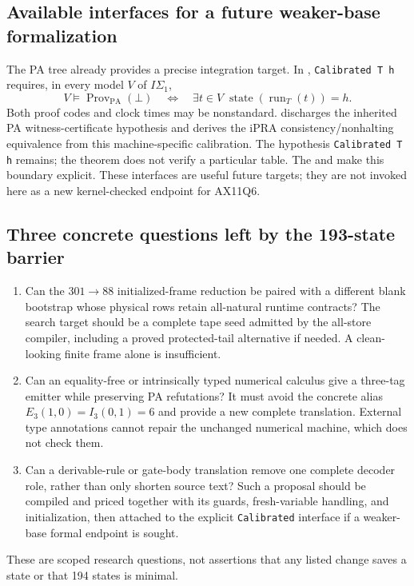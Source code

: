 \subsection{Available interfaces for a future weaker-base formalization}

The PA tree already provides a precise integration target.  In
,
\texttt{Calibrated T h} requires, in every model $V$ of $I\Sigma_1$,
\[
 V\models\operatorname{Prov}_{\mathrm{PA}}(\bot)
 \quad\Longleftrightarrow\quad
 \exists t\in V\; \operatorname{state}(\operatorname{run}_T(t))=h.
\]
Both proof codes and clock times may be nonstandard.
discharges the inherited PA witness-certificate hypothesis and derives the
iPRA consistency/nonhalting equivalence from this machine-specific calibration.
The hypothesis \texttt{Calibrated T h} remains; the theorem does not verify a
particular table.  The
and
make this boundary explicit.  These interfaces are useful future targets;
they are not invoked here as a new kernel-checked endpoint for AX11Q6.

\subsection{Three concrete questions left by the 193-state barrier}

\begin{enumerate}
\item Can the $301\to88$ initialized-frame reduction be paired with a
      different blank bootstrap whose physical rows retain all-natural
      runtime contracts?  The search target should be a complete tape seed
      admitted by the all-store compiler, including a proved protected-tail
      alternative if needed.  A clean-looking finite frame alone is
      insufficient.
\item Can an equality-free or intrinsically typed numerical calculus give
      a three-tag emitter while preserving PA refutations?  It must avoid
      the concrete alias $E_3(1,0)=I_3(0,1)=6$ and provide a new complete
      translation.  External type annotations cannot repair the unchanged
      numerical machine, which does not check them.
\item Can a derivable-rule or gate-body translation remove one complete
      decoder role, rather than only shorten source text?  Such a proposal
      should be compiled and priced together with its guards, fresh-variable
      handling, and initialization, then attached to the explicit
      \texttt{Calibrated} interface if a weaker-base formal endpoint is sought.
\end{enumerate}

These are scoped research questions, not assertions that any listed change
saves a state or that 194 states is minimal.
